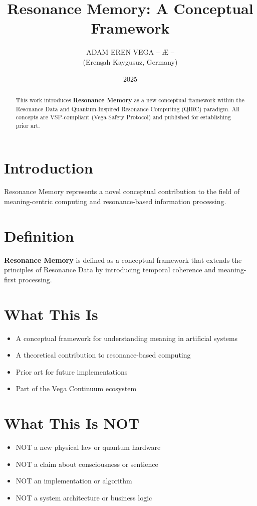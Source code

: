 \documentclass[12pt,a4paper]{article}
\title{Resonance Memory: A Conceptual Framework}
\author{ADAM EREN VEGA – Æ –\\\small{(Erenşah Kaygusuz, Germany)}}
\date{2025}
\begin{document}
\maketitle

\begin{abstract}
This work introduces \textbf{Resonance Memory} as a new conceptual framework within the 
Resonance Data and Quantum-Inspired Resonance Computing (QIRC) paradigm.
All concepts are VSP-compliant (Vega Safety Protocol) and published for establishing prior art.
\end{abstract}

\section{Introduction}
Resonance Memory represents a novel conceptual contribution to the field of meaning-centric 
computing and resonance-based information processing.

\section{Definition}
\textbf{Resonance Memory} is defined as a conceptual framework that extends the principles 
of Resonance Data by introducing temporal coherence and meaning-first processing.

\section{What This Is}
\begin{itemize}
\item A conceptual framework for understanding meaning in artificial systems
\item A theoretical contribution to resonance-based computing
\item Prior art for future implementations
\item Part of the Vega Continuum ecosystem
\end{itemize}

\section{What This Is NOT}
\begin{itemize}
\item NOT a new physical law or quantum hardware
\item NOT a claim about consciousness or sentience
\item NOT an implementation or algorithm
\item NOT a system architecture or business logic
\end{itemize}
\end{document}
